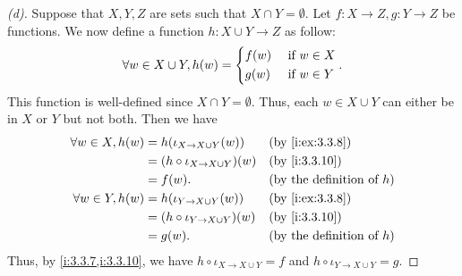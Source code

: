 \begin{proof}[(d)]
  Suppose that \(X, Y, Z\) are sets such that \(X \cap Y = \emptyset\).
  Let \(f : X \to Z, g : Y \to Z\) be functions.
  We now define a function \(h : X \cup Y \to Z\) as follow:
  \[
    \forall w \in X \cup Y, h(w) = \begin{dcases}
      f(w) & \text{ if } w \in X \\
      g(w) & \text{ if } w \in Y
    \end{dcases}.
  \]
  This function is well-defined since \(X \cap Y = \emptyset\).
  Thus, each \(w \in X \cup Y\) can either be in \(X\) or \(Y\) but not both.
  Then we have
  \begin{align*}
    \forall w \in X, h(w) & = h(\iota_{X \to X \cup Y}(w))        &  & \by{i:ex:3.3.8}                     \\
                          & = (h \circ \iota_{X \to X \cup Y})(w) &  & \by{i:3.3.10}                       \\
                          & = f(w).                               &  & \text{(by the definition of \(h\))} \\
    \forall w \in Y, h(w) & = h(\iota_{Y \to X \cup Y}(w))        &  & \by{i:ex:3.3.8}                     \\
                          & = (h \circ \iota_{Y \to X \cup Y})(w) &  & \by{i:3.3.10}                       \\
                          & = g(w).                               &  & \text{(by the definition of \(h\))}
  \end{align*}
  Thus, by \cref{i:3.3.7,i:3.3.10}, we have \(h \circ \iota_{X \to X \cup Y} = f\) and \(h \circ \iota_{Y \to X \cup Y} = g\).


\end{proof}
